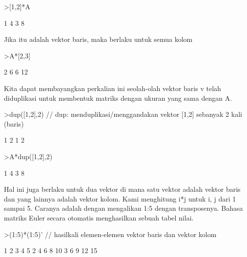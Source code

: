\documentclass{article}
\begin{document}
\begin{eulernotebook}
\begin{eulerprompt}
>[1,2]*A
\end{eulerprompt}
\begin{euleroutput}
              1             4 
              3             8 
\end{euleroutput}
\begin{eulercomment}
Jika itu adalah vektor baris, maka berlaku untuk semua kolom
\end{eulercomment}
\begin{eulerprompt}
>A*[2,3]
\end{eulerprompt}
\begin{euleroutput}
              2             6 
              6            12 
\end{euleroutput}
\begin{eulercomment}
Kita dapat membayangkan perkalian ini seolah-olah vektor baris v telah
diduplikasi untuk membentuk matriks dengan ukuran yang sama dengan A.
\end{eulercomment}
\begin{eulerprompt}
>dup([1,2],2) // dup: menduplikasi/menggandakan vektor [1,2] sebanyak 2 kali (baris)
\end{eulerprompt}
\begin{euleroutput}
              1             2 
              1             2 
\end{euleroutput}
\begin{eulerprompt}
>A*dup([1,2],2) 
\end{eulerprompt}
\begin{euleroutput}
              1             4 
              3             8 
\end{euleroutput}
\begin{eulercomment}
Hal ini juga berlaku untuk dua vektor di mana satu vektor adalah
vektor baris dan yang lainnya adalah vektor kolom. Kami menghitung i*j
untuk i, j dari 1 sampai 5. Caranya adalah dengan mengalikan 1:5
dengan transposenya. Bahasa matriks Euler secara otomatis menghasilkan
sebuah tabel nilai.
\end{eulercomment}
\begin{eulerprompt}
>(1:5)*(1:5)' // hasilkali elemen-elemen vektor baris dan vektor kolom
\end{eulerprompt}
\begin{euleroutput}
              1             2             3             4             5 
              2             4             6             8            10 
              3             6             9            12            15 

\end{euleroutput}
\end{eulernotebook}
\end{document}
